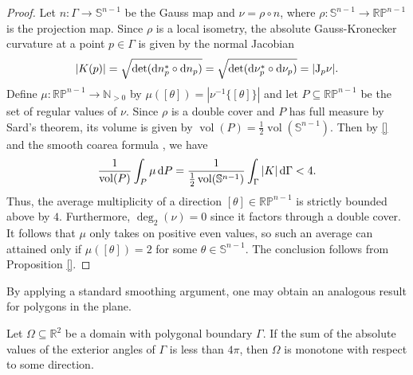 \begin{proof}
  Let $n \colon \Gamma \to \mathbb{S}^{n-1}$ be the Gauss map and $\nu = \rho \circ n$, where $\rho \colon \mathbb{S}^{n-1} \to \mathbb{RP}^{n-1}$ is the projection map. Since $\rho$ is a local isometry, the absolute Gauss-Kronecker curvature at a point $p \in \Gamma$ is given by the normal Jacobian
  \begin{equation}
    |K(p)| = \sqrt{ \det ({\rm d} n_p^{*} \circ {\rm d} n_p)} = \sqrt{ \det ({\rm d} \nu_p^{*} \circ {\rm d} \nu_p)} = |\mathrm{J}_p\nu|.
  \end{equation}
  Define $\mu \colon \mathbb{RP}^{n-1} \to \mathbb{N}_{> 0}$ by $\mu([\theta]) = |\nu^{-1}\{[\theta]\}|$ and let $P \subseteq \mathbb{RP}^{n-1}$ be the set of regular values of $\nu$. Since $\rho$ is a double cover and $P$ has full measure by Sard's theorem, its volume is given by $\operatorname{vol}(P) =  \frac{1}{2}\operatorname{vol}(\mathbb{S}^{n-1})$. Then by \eqref{} and the smooth coarea formula \cite{}, we have
  \begin{equation}
    \frac{1}{\operatorname{vol}(P)} \int_{P} \mu \, {\rm d} P = \frac{1}{\frac{1}{2}\operatorname{vol}(\mathbb{S}^{n-1})}\int_{\Gamma} |K| \, {\rm d} \Gamma < 4.
  \end{equation}
  Thus, the average multiplicity of a direction $[\theta] \in \mathbb{RP}^{n-1}$ is strictly bounded above by $4$. Furthermore, $\deg_2 (\nu) =  0$ since it factors through a double cover. It follows that $\mu$ only takes on positive even values, so such an average can attained only if $\mu([\theta]) = 2$ for some $\theta \in \mathbb{S}^{n-1}$. The conclusion follows from Proposition \ref{}.
\end{proof}

By applying a standard smoothing argument, one may obtain an analogous result for polygons in the plane.

\begin{theorem}
Let $\Omega \subseteq \mathbb{R}^2$ be a domain with polygonal boundary $\Gamma$. If the sum of the absolute values of the exterior angles of $\Gamma$ is less than $4\pi$, then $\Omega$ is monotone with respect to some direction.
\end{theorem}

